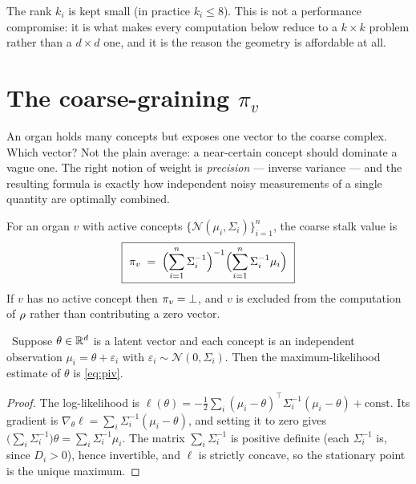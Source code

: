 The rank $k_i$ is kept small (in practice $k_i\le8$). This is not a
performance compromise: it is what makes every computation below reduce
to a $k\times k$ problem rather than a $d\times d$ one, and it is the
reason the geometry is affordable at all.

\section{The coarse-graining $\pi_v$}

\begin{intu}\Intu
An organ holds many concepts but exposes one vector to the coarse
complex. Which vector? Not the plain average: a near-certain concept
should dominate a vague one. The right notion of weight is
\emph{precision} --- inverse variance --- and the resulting formula is
exactly how independent noisy measurements of a single quantity are
optimally combined.
\end{intu}

\begin{construction}\label{con:piv}
For an organ $v$ with active concepts
$\{\mathcal N(\mu_i,\Sigma_i)\}_{i=1}^n$, the coarse stalk value is
\begin{equation}\label{eq:piv}
  \boxed{\ \pi_v\;=\;
  \Bigl(\sum_{i=1}^n\Sigma_i^{-1}\Bigr)^{-1}
  \Bigl(\sum_{i=1}^n\Sigma_i^{-1}\mu_i\Bigr)\ }
\end{equation}
If $v$ has no active concept then $\pi_v=\bot$, and $v$ is excluded from
the computation of $\rho$ rather than contributing a zero vector.
\end{construction}

\begin{proposition}\label{prop:pivmle}
\Proved\ Suppose $\theta\in\mathbb{R}^{d}$ is a latent vector and each concept is an
independent observation $\mu_i=\theta+\varepsilon_i$ with
$\varepsilon_i\sim\mathcal N(0,\Sigma_i)$. Then the maximum-likelihood
estimate of $\theta$ is \eqref{eq:piv}.
\end{proposition}
\begin{proof}
The log-likelihood is
$\ell(\theta)=-\tfrac12\sum_i(\mu_i-\theta)^\top\Sigma_i^{-1}(\mu_i-\theta)
+\text{const}$.
Its gradient is
$\nabla_\theta\ell=\sum_i\Sigma_i^{-1}(\mu_i-\theta)$, and setting it to
zero gives $\bigl(\sum_i\Sigma_i^{-1}\bigr)\theta=\sum_i\Sigma_i^{-1}\mu_i$.
The matrix $\sum_i\Sigma_i^{-1}$ is positive definite (each
$\Sigma_i^{-1}$ is, since $D_i>0$), hence invertible, and $\ell$ is
strictly concave, so the stationary point is the unique maximum.
\end{proof}

